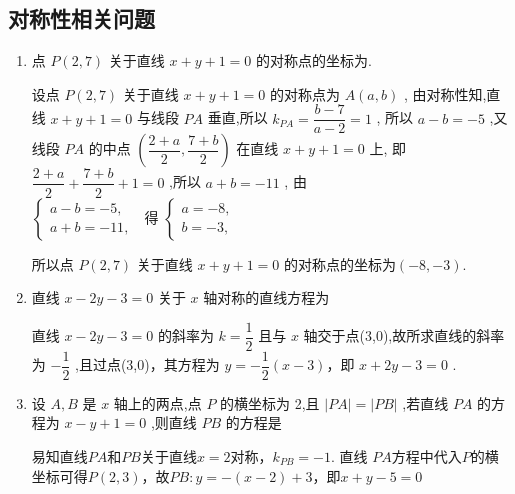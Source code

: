 \subsection*{对称性相关问题}
\begin{enumerate}
    \item 点 $P\left( {2,7}\right)$ 关于直线 $x + y + 1 = 0$ 的对称点的坐标为.
    \begin{jieda}
        设点 $P\left( {2,7}\right)$ 关于直线 $x + y + 1 = 0$ 的对称点为 $A\left( {a,b}\right)$ ,
        由对称性知,直线 $x + y + 1 = 0$ 与线段 ${PA}$ 垂直,所以 ${k}_{PA} = \dfrac{b - 7}{a - 2} = 1$ ,
        所以 $a - b =  - 5$ ,又线段 ${PA}$ 的中点 $\left( {\dfrac{2 + a}{2},\dfrac{7 + b}{2}}\right)$ 在直线 $x + y + 1 = 0$ 上,
        即 $\dfrac{2 + a}{2} + \dfrac{7 + b}{2} + 1 = 0$ ,所以 $a + b =  - {11}$ ,
        由 $\left\{  {\begin{array}{l} a - b =  - 5, \\  a + b =  - {11}, \end{array}\;\text{ 得 }\left\{  \begin{array}{l} a =  - 8, \\  b =  - 3, \end{array}\right. }\right.$

        所以点 $P\left( {2,7}\right)$ 关于直线 $x + y + 1 = 0$ 的对称点的坐标为$(-8, -3)$.
    \end{jieda}

    \item 直线 $x - {2y} - 3 = 0$ 关于 $x$ 轴对称的直线方程为
    \begin{jieda}
        直线 $x - {2y} - 3 = 0$ 的斜率为 $k = \dfrac{1}{2}$ 且与 $x$ 轴交于点(3,0),故所求直线的斜率为 $- \dfrac{1}{2}$ ,且过点(3,0)，其方程为 $y =  - \dfrac{1}{2}\left( {x - 3}\right)$，即 $x + {2y} - 3 = 0$ .
    \end{jieda}
    
        
    \item 设 $A,B$ 是 $x$ 轴上的两点,点 $P$ 的横坐标为 2,且 $\left| {PA}\right|  = \left| {PB}\right|$ ,若直线 ${PA}$ 的方程为 $x - y + 1 = 0$ ,则直线 ${PB}$ 的方程是
    \begin{jieda}
        易知直线$PA$和$PB$关于直线$x = 2$对称，$k_{PB} = -1$. 直线 ${PA}$方程中代入$P$的横坐标可得$P(2, 3)$，故$PB: y = -(x-2)+3$，即$x + y - 5 = 0$
    \end{jieda}
    

\end{enumerate}
